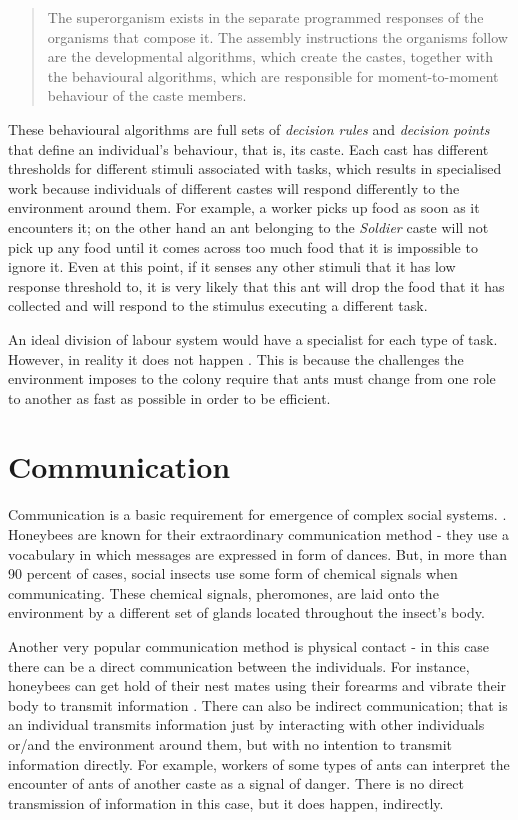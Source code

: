 \begin{quotation}The superorganism exists in the separate programmed responses of the organisms that compose it. The assembly instructions the organisms follow are the developmental algorithms, which create the castes, together with the behavioural algorithms, which are responsible for moment-to-moment behaviour of the caste members.
\end{quotation}


These behavioural algorithms are full sets of \emph{decision rules} and \emph{decision points} that define an individual's behaviour, that is, its caste. Each cast has different thresholds for different stimuli associated with tasks, which results in specialised work because individuals of different castes will respond differently to the environment around them. For example, a worker picks up food as soon as it encounters it; on the other hand an ant belonging to the \emph{Soldier} caste will not pick up any food until it comes across too much food that it is impossible to ignore it. Even at this point, if it senses any other stimuli that it has low response threshold to, it is very likely that this ant will drop the food that it has collected and will respond to the stimulus executing a different task.

An ideal division of labour system would have a specialist for each type of task. However, in reality it does not happen \cite{wilson1968} \cite{oster1979caste}. This is because the challenges the environment imposes to the colony require that ants must change from one role to another as fast as possible in order to be efficient.

\section {Communication}
\label{sec:ant-comm}

Communication is a basic requirement for emergence of complex social systems. \cite{seeley1995wisdom}. Honeybees are known for their extraordinary communication method - they use a vocabulary in which messages are expressed in form of dances. \cite{Bienentanz} But, in more than 90 percent of cases, social insects use some form of chemical signals when communicating. \cite{citeulike:3731267} These chemical signals, pheromones, are laid onto the environment by a different set of glands located throughout the insect's body. 

Another very popular communication method is physical contact - in this case there can be a direct communication between the individuals. For instance, honeybees can get hold of their nest mates using their forearms and vibrate their body to transmit information \cite{allen1959}. There can also be  indirect communication; that is an individual transmits information just by interacting with other individuals or/and the environment around them, but with no intention to transmit information directly. For example, workers of some types of ants can interpret the encounter of ants of another caste as a signal of danger. There is no direct transmission of information in this case, but it does happen, indirectly.

